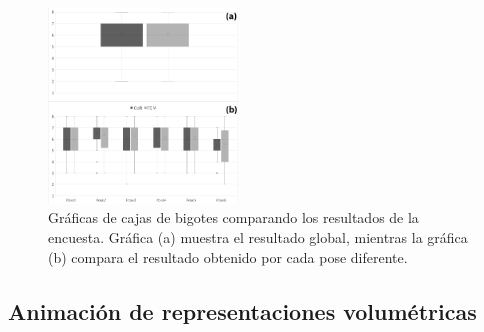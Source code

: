 %
\begin{figure}[h]%
   \centering
   \includegraphics[width=0.45\textwidth]{IMG/boxplot}
    \caption{ Gráficas de cajas de bigotes comparando los resultados de la encuesta. Gráfica (a) muestra el resultado global, mientras la gráfica (b) compara el resultado obtenido por cada pose diferente.}
\label{fig:stat}
   \end{figure}


\subsection{ Animación de representaciones volumétricas}

